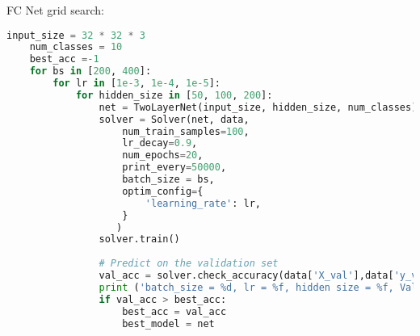 \documentclass[a4paper]{article}
\begin{document}
FC Net grid search:
\begin{lstlisting}[language=Python, caption=FC Net grid search]
    input_size = 32 * 32 * 3
    num_classes = 10
    best_acc =-1
    for bs in [200, 400]:
        for lr in [1e-3, 1e-4, 1e-5]:
            for hidden_size in [50, 100, 200]:
                net = TwoLayerNet(input_size, hidden_size, num_classes)
                solver = Solver(net, data,
                    num_train_samples=100,
                    lr_decay=0.9,
                    num_epochs=20,
                    print_every=50000,
                    batch_size = bs,
                    optim_config={
                        'learning_rate': lr,
                    }
                   )
                solver.train()
    
                # Predict on the validation set
                val_acc = solver.check_accuracy(data['X_val'],data['y_val'])
                print ('batch_size = %d, lr = %f, hidden size = %f, Valid_accuracy: %f' %(bs, lr, hidden_size,val_acc))
                if val_acc > best_acc:
                    best_acc = val_acc
                    best_model = net
\end{lstlisting}
\end{document}
